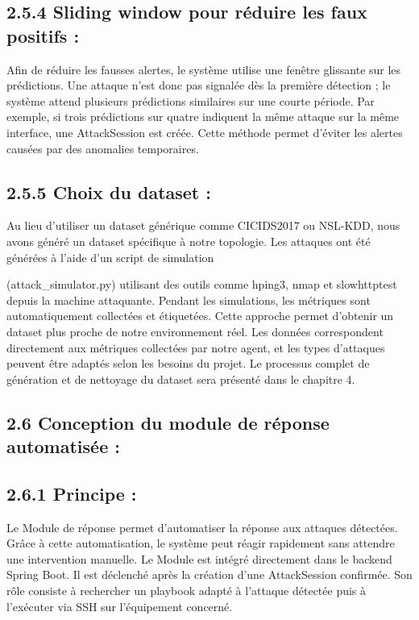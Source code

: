 \documentclass[12pt,a4paper]{report}
\begin{document}
\subsection*{2.5.4 Sliding window pour réduire les faux positifs :}
Afin de réduire les fausses alertes, le système utilise une fenêtre glissante sur les prédictions. Une attaque n’est donc pas signalée dès la première détection ; le système attend plusieurs prédictions similaires sur une courte période. Par exemple, si trois prédictions sur quatre indiquent la même attaque sur la même interface, une AttackSession est créée. Cette méthode permet d’éviter les alertes causées par des anomalies temporaires.\par
\subsection*{2.5.5 Choix du dataset :}
Au lieu d’utiliser un dataset générique comme CICIDS2017 ou NSL-KDD, nous avons généré un dataset spécifique à notre topologie. Les attaques ont été générées à l’aide d’un script de simulation\par
(attack\_simulator.py) utilisant des outils comme hping3, nmap et slowhttptest depuis la machine attaquante. Pendant les simulations, les métriques sont automatiquement collectées et étiquetées. Cette approche permet d’obtenir un dataset plus proche de notre environnement réel. Les données correspondent directement aux métriques collectées par notre agent, et les types d’attaques peuvent être adaptés selon les besoins du projet. Le processus complet de génération et de nettoyage du dataset sera présenté dans le chapitre 4.\par
\subsection*{2.6 Conception du module de réponse automatisée :}
\subsection*{2.6.1 Principe :}
Le Module de réponse permet d’automatiser la réponse aux attaques détectées. Grâce à cette automatisation, le système peut réagir rapidement sans attendre une intervention manuelle. Le Module est intégré directement dans le backend Spring Boot. Il est déclenché après la création d’une AttackSession confirmée. Son rôle consiste à rechercher un playbook adapté à l’attaque détectée puis à l’exécuter via SSH sur l’équipement concerné.\par
\end{document}
